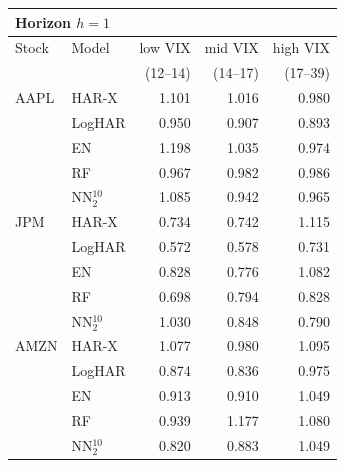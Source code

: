 \begin{tabular}{ll rrr}
\toprule
\multicolumn{5}{l}{\textbf{Horizon $h=1$}} \\
\midrule
Stock & Model & low VIX & mid VIX & high VIX \\
 & & (12--14) & (14--17) & (17--39) \\
\midrule
AAPL & HAR-X & 1.101 & 1.016 & 0.980 \\
 & LogHAR & 0.950 & 0.907 & 0.893 \\
 & EN & 1.198 & 1.035 & 0.974 \\
 & RF & 0.967 & 0.982 & 0.986 \\
 & NN$_2^{10}$ & 1.085 & 0.942 & 0.965 \\
\addlinespace
JPM & HAR-X & 0.734 & 0.742 & 1.115 \\
 & LogHAR & 0.572 & 0.578 & 0.731 \\
 & EN & 0.828 & 0.776 & 1.082 \\
 & RF & 0.698 & 0.794 & 0.828 \\
 & NN$_2^{10}$ & 1.030 & 0.848 & 0.790 \\
\addlinespace
AMZN & HAR-X & 1.077 & 0.980 & 1.095 \\
 & LogHAR & 0.874 & 0.836 & 0.975 \\
 & EN & 0.913 & 0.910 & 1.049 \\
 & RF & 0.939 & 1.177 & 1.080 \\
 & NN$_2^{10}$ & 0.820 & 0.883 & 1.049 \\
\bottomrule
\end{tabular}
\vspace{1em}

